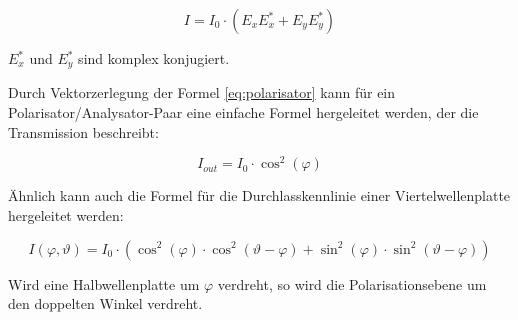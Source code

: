 \begin{equation}
    I = I_0 \cdot \left(E_xE^*_x + E_yE^*_y\right)
    \label{eq:intensitaet}
\end{equation}

$E_x^*$ und $E_y^*$ sind komplex konjugiert.

Durch   Vektorzerlegung  der  Formel   \ref{eq:polarisator}   kann   f\"ur   ein
Polarisator/Analysator-Paar  eine  einfache  Formel  hergeleitet werden, der die
Transmission beschreibt:

\begin{equation}
    I_{out} = I_0 \cdot \cos^2(\varphi)
    \label{eq:pol_paar}
\end{equation}

\"Ahnlich   kann   auch  die   Formel   f\"ur   die   Durchlasskennlinie   einer
Viertelwellenplatte hergeleitet werden:

\begin{equation}
    I(\varphi,\vartheta) = I_0\cdot\left(\cos^2(\varphi)\cdot\cos^2(\vartheta-\varphi) + \sin^2(\varphi)\cdot\sin^2(\vartheta-\varphi)\right)
    \label{eq:pol_zirkular}
\end{equation}

Wird eine Halbwellenplatte um $\varphi$ verdreht, so wird die Polarisationsebene
um den doppelten Winkel verdreht.
